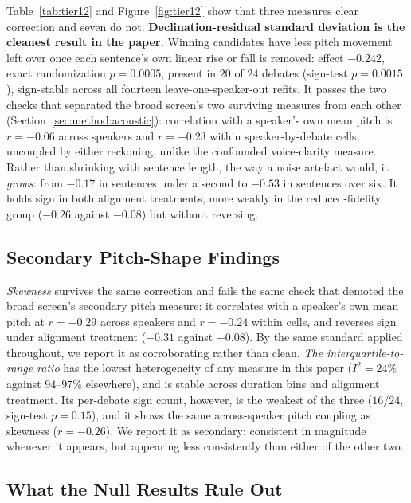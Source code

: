 \documentclass[journal]{IEEEtran}
\begin{document}
Table~\ref{tab:tier12} and Figure~\ref{fig:tier12} show that three measures
clear correction and seven do not. \textbf{Declination-residual standard
deviation is the cleanest result in the paper.} Winning candidates have less
pitch movement left over once each sentence's own linear rise or fall is
removed: effect $-0.242$, exact randomization $p = 0.0005$, present in $20$
of $24$ debates (sign-test $p = 0.0015$), sign-stable across all fourteen
leave-one-speaker-out refits. It passes the two checks that separated the
broad screen's two surviving measures from each other
(Section~\ref{sec:method:acoustic}): correlation with a speaker's own mean
pitch is $r = -0.06$ across speakers and $r = +0.23$ within
speaker-by-debate cells, uncoupled by either reckoning, unlike the confounded
voice-clarity measure. Rather than shrinking with sentence length, the way a
noise artefact would, it \emph{grows}: from $-0.17$ in sentences under a
second to $-0.53$ in sentences over six. It holds sign in both alignment
treatments, more weakly in the reduced-fidelity group ($-0.26$ against
$-0.08$) but without reversing.

\subsection{Secondary Pitch-Shape Findings}
\label{sec:pitch:secondary}

\emph{Skewness} survives the same correction and fails the same check that
demoted the broad screen's secondary pitch measure: it correlates with a
speaker's own mean pitch at $r = -0.29$ across speakers and $r = -0.24$
within cells, and reverses sign under alignment treatment ($-0.31$ against
$+0.08$). By the same standard applied throughout, we report it as
corroborating rather than clean. \emph{The interquartile-to-range ratio} has
the lowest heterogeneity of any measure in this paper ($I^2 = 24\%$ against
$94$--$97\%$ elsewhere), and is stable across duration bins and alignment
treatment. Its per-debate sign count, however, is the weakest of the three
($16/24$, sign-test $p = 0.15$), and it shows the same across-speaker pitch
coupling as skewness ($r = -0.26$). We report it as secondary: consistent in
magnitude whenever it appears, but appearing less consistently than either
of the other two.

\subsection{What the Null Results Rule Out}
\label{sec:pitch:nulls}
\end{document}
